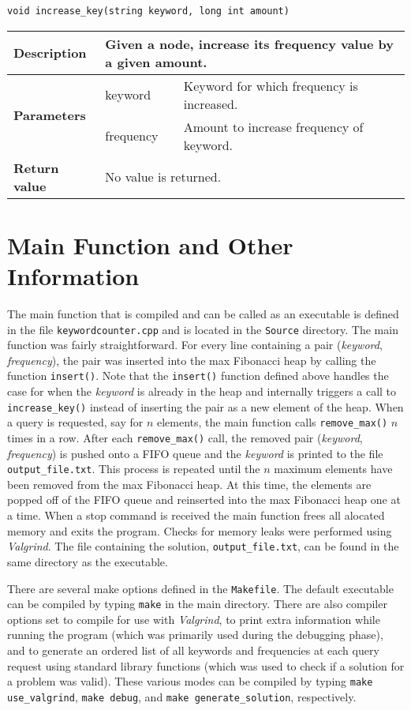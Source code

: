 \documentclass[12pt, reqno]{amsart}
\begin{document}
{\large \texttt{void increase\_key(string keyword, long int amount)}}
\begin{center}
    \begin{tabular}{| l | p{2.5cm} | p{9.5cm} |}
    \hline
    {\bfseries Description} & \multicolumn{2}{p{12.5cm}|}{Given a node, increase its frequency value by a given amount.} \\ \hline
    \multirow{2}{*}{\bfseries Parameters} & keyword & Keyword for which frequency is increased. \\ \cline{2-3}
    & frequency & Amount to increase frequency of keyword. \\ \hline
    {\bfseries Return value} & \multicolumn{2}{p{12.5cm}|}{No value is returned.} \\ \hline
    \end{tabular}
\end{center}


\newpage
\section*{Main Function and Other Information}
The main function that is compiled and can be called as an executable is defined in the file \texttt{keywordcounter.cpp} and is located in the \texttt{Source} directory. The main function was fairly straightforward. For every line containing a pair (\emph{keyword}, \emph{frequency}), the pair was inserted into the max Fibonacci heap by calling the function \texttt{insert()}. Note that the \texttt{insert()} function defined above handles the case for when the \emph{keyword} is already in the heap and internally triggers a call to \texttt{increase\_key()} instead of inserting the pair as a new element of the heap. When a query is requested, say for $n$ elements, the main function calls \texttt{remove\_max()} $n$ times in a row. After each \texttt{remove\_max()} call, the removed pair (\emph{keyword}, \emph{frequency}) is pushed onto a FIFO queue and the \emph{keyword} is printed to the file \texttt{output\_file.txt}. This process is repeated until the $n$ maximum elements have been removed from the max Fibonacci heap. At this time, the elements are popped off of the FIFO queue and reinserted into the max Fibonacci heap one at a time. When a stop command is received the main function frees all alocated memory and exits the program. Checks for memory leaks were performed using \emph{Valgrind}. The file containing the solution, \texttt{output\_file.txt}, can be found in the same directory as the executable.

There are several make options defined in the \texttt{Makefile}. The default executable can be compiled by typing \texttt{make} in the main directory. There are also compiler options set to compile for use with \emph{Valgrind}, to print extra information while running the program (which was primarily used during the debugging phase), and to generate an ordered list of all keywords and frequencies at each query request using standard library functions (which was used to check if a solution for a problem was valid). These various modes can be compiled by typing \texttt{make use\_valgrind}, \texttt{make debug}, and \texttt{make generate\_solution}, respectively. 
\end{document}
